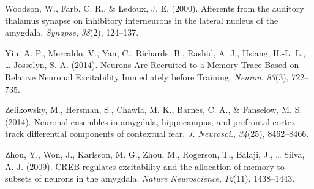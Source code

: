 \documentclass[12pt,a4paperpaper,]{report}
\begin{document}
\hypertarget{ref-woodsonux5fafferentsux5f2000}{}
Woodson, W., Farb, C. R., \& Ledoux, J. E. (2000). Afferents from the
auditory thalamus synapse on inhibitory interneurons in the lateral
nucleus of the amygdala. \emph{Synapse}, \emph{38}(2), 124--137.

\hypertarget{ref-yiuux5fneuronsux5f2014}{}
Yiu, A. P., Mercaldo, V., Yan, C., Richards, B., Rashid, A. J., Hsiang,
H.-L. L., \ldots{} Josselyn, S. A. (2014). Neurons Are Recruited to a
Memory Trace Based on Relative Neuronal Excitability Immediately before
Training. \emph{Neuron}, \emph{83}(3), 722--735.

\hypertarget{ref-zelikowskyux5fneuronalux5f2014}{}
Zelikowsky, M., Hersman, S., Chawla, M. K., Barnes, C. A., \& Fanselow,
M. S. (2014). Neuronal ensembles in amygdala, hippocampus, and
prefrontal cortex track differential components of contextual fear.
\emph{J. Neurosci.}, \emph{34}(25), 8462--8466.

\hypertarget{ref-zhouux5fcrebux5f2009}{}
Zhou, Y., Won, J., Karlsson, M. G., Zhou, M., Rogerson, T., Balaji, J.,
\ldots{} Silva, A. J. (2009). CREB regulates excitability and the
allocation of memory to subsets of neurons in the amygdala. \emph{Nature
Neuroscience}, \emph{12}(11), 1438--1443.
\end{document}
